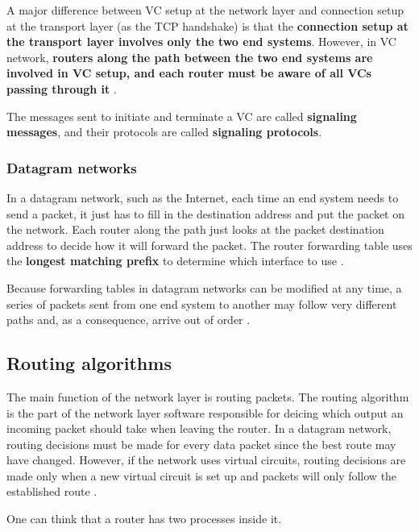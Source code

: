 A major difference between VC setup at the network layer and connection setup at the transport layer (as the TCP handshake) is that the \textbf{connection setup at the transport layer involves only the two end systems}. However, in VC network, \textbf{routers along the path between the two end systems are involved in VC setup, and each router must be aware of all VCs passing through it} \cite[p.~316]{computer-networking-kurose-2012}.

The messages sent to initiate and terminate a VC are called \textbf{signaling messages}, and their protocols are called \textbf{signaling protocols}.

\subsubsection{Datagram networks}

In a datagram network, such as the Internet, each time an end system needs to send a packet, it just has to fill in the destination address and put the packet on the network.
Each router along the path just looks at the packet destination address to decide how it will forward the packet.
The router forwarding table uses the \textbf{longest matching prefix} to determine which interface to use \cite[p.~318]{computer-networking-kurose-2012}.

Because forwarding tables in datagram networks can be modified at any time, a series of packets sent from one end system to another may follow very different paths and, as a consequence, arrive out of order \cite[p.~319]{computer-networking-kurose-2012}.

\subsection{Routing algorithms}

The main function of the network layer is routing packets.
The routing algorithm is the part of the network layer software responsible for deicing which output an incoming packet should take when leaving the router.
In a datagram network, routing decisions must be made for every data packet since the best route may have changed.
However, if the network uses virtual circuits, routing decisions are made only when a new virtual circuit is set up and packets will only follow the established route \cite[p.~362]{computer-networks-tanenbaum-2012}.

One can think that a router has two processes inside it.

